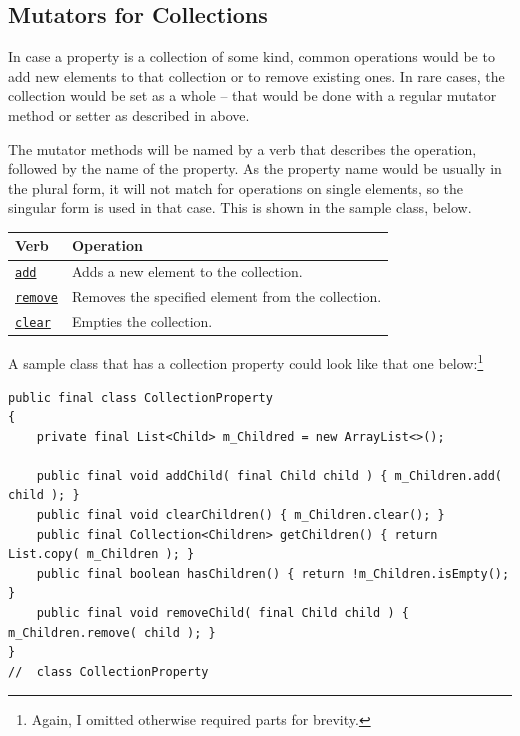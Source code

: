 
\subsection{Mutators for Collections}\label{sec:NamesForCollectionMutators}
In case a property is a collection of some kind, common operations would be to add new elements to that collection or to remove existing ones. In rare cases, the collection would be set as a whole – that would be done with a regular mutator method or setter as described in  above.

The mutator methods will be named by a verb that describes the operation, followed by the name of the property. As the property name would be usually in the plural form, it will not match for operations on single elements, so the singular form is used in that case. This is shown in the sample class, below.

\begin{tabular}{|l|l|}
\hline 
\textbf{Verb} & \textbf{Operation} \\ 
\hline 
\hyperref[verb:add]{\lstinline|add|} & Adds a new element to the collection\index{collection}. \\ 
\hyperref[verb:remove]{\lstinline|remove|} & Removes the specified element from the collection\index{collection}. \\ 
\hyperref[verb:clear]{\lstinline|clear|} & Empties the collection\index{collection}. \\  
\hline 
\end{tabular}

A sample class that has a collection property could look like that one below:\footnote{Again, I omitted otherwise required parts for brevity.}
\begin{lstlisting}[caption={Collection Property}]
public final class CollectionProperty
{
    private final List<Child> m_Childred = new ArrayList<>();

    public final void addChild( final Child child ) { m_Children.add( child ); }
    public final void clearChildren() { m_Children.clear(); }
    public final Collection<Children> getChildren() { return List.copy( m_Children ); }
    public final boolean hasChildren() { return !m_Children.isEmpty(); }
    public final void removeChild( final Child child ) { m_Children.remove( child ); }
}
//  class CollectionProperty
\end{lstlisting}

